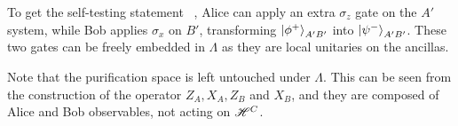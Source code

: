 To get the self-testing statement ~, Alice can apply an extra $\sigma_z$ gate on the $A'$ system, while Bob applies $\sigma_x$ on $B'$, transforming $\ket{\phi^+}_{A'B'}$ into $\ket{\psi^-}_{A'B'}$. These two gates can be freely embedded in $\Lambda$ as they are local unitaries on the ancillas.

Note that the purification space is left untouched under $\Lambda$. This can be seen from the construction of the operator $Z_A,X_A,Z_B$ and $X_B$, and they are composed of Alice and Bob observables, not acting on $\mathscr{H}^C$. 

